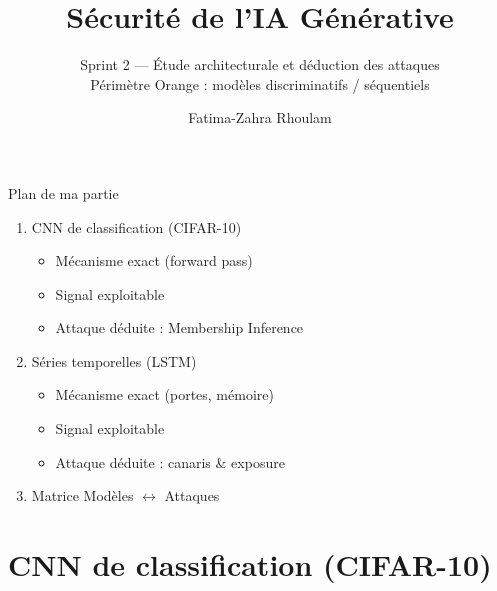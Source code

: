 \documentclass[11pt]{beamer}
\title{Sécurité de l'IA Générative}
\subtitle{Sprint 2 --- Étude architecturale et déduction des attaques\\[2pt]
\textcolor{orange!80!black}{\large Périmètre Orange : modèles discriminatifs / séquentiels}}
\author{Fatima-Zahra Rhoulam}
\institute{Télécom SudParis}
\date{}
\begin{document}
\begin{frame}
  \titlepage
\end{frame}

\begin{frame}{Plan de ma partie}
  \begin{enumerate}
    \item CNN de classification (CIFAR-10)
    \begin{itemize}
      \item Mécanisme exact (forward pass)
      \item Signal exploitable
      \item Attaque déduite : Membership Inference
    \end{itemize}
    \item Séries temporelles (LSTM)
    \begin{itemize}
      \item Mécanisme exact (portes, mémoire)
      \item Signal exploitable
      \item Attaque déduite : canaris \& exposure
    \end{itemize}
    \item Matrice Modèles $\leftrightarrow$ Attaques
  \end{enumerate}
\end{frame}

\section{CNN de classification (CIFAR-10)}
\end{document}
